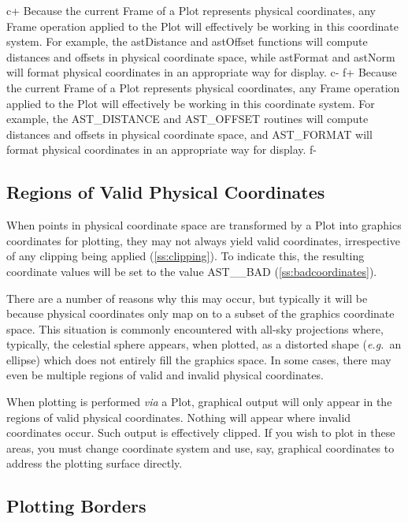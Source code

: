 \documentclass[twoside,11pt]{article}
\newcommand{\secref}[1]{\S\ref{#1}}
\renewcommand{\secref}[1]{\ref{#1}}
\begin{document}
c+
Because the current Frame of a Plot represents physical coordinates,
any Frame operation applied to the Plot will effectively be working in
this coordinate system. For example, the astDistance and astOffset
functions will compute distances and offsets in physical coordinate
space, while astFormat and astNorm will format physical coordinates in
an appropriate way for display.
c-
f+
Because the current Frame of a Plot represents physical coordinates,
any Frame operation applied to the Plot will effectively be working in
this coordinate system. For example, the AST\_DISTANCE and AST\_OFFSET
routines will compute distances and offsets in physical coordinate
space, and AST\_FORMAT will format physical coordinates in an
appropriate way for display.
f-

\subsection{\label{ss:validphysicalcoordinates}Regions of Valid Physical Coordinates}

When points in physical coordinate space are transformed by a Plot
into graphics coordinates for plotting, they may not always yield
valid coordinates, irrespective of any clipping being applied
(\secref{ss:clipping}). To indicate this, the resulting coordinate
values will be set to the value AST\_\_BAD
(\secref{ss:badcoordinates}).

There are a number of reasons why this may occur, but typically it
will be because physical coordinates only map on to a subset of the
graphics coordinate space. This situation is commonly encountered with
all-sky projections where, typically, the celestial sphere appears,
when plotted, as a distorted shape ({\em{e.g.}}\ an ellipse) which
does not entirely fill the graphics space. In some cases, there may
even be multiple regions of valid and invalid physical coordinates.

When plotting is performed {\em{via}} a Plot, graphical output will
only appear in the regions of valid physical coordinates. Nothing will
appear where invalid coordinates occur. Such output is effectively
clipped. If you wish to plot in these areas, you must change
coordinate system and use, say, graphical coordinates to address the
plotting surface directly.

\subsection{Plotting Borders}
\end{document}
